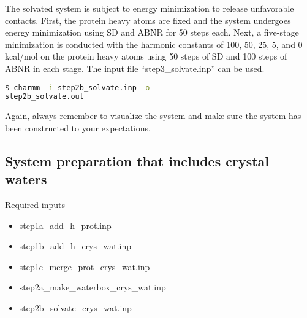 The solvated system is subject to energy minimization to release unfavorable contacts. 
First, the protein heavy atoms are fixed and the system undergoes energy minimization using SD and ABNR for 50 steps each. 
Next, a five-stage minimization is conducted with the harmonic constants
of 100, 50, 25, 5, and 0 kcal/mol on the protein heavy atoms using 50 steps of SD and 100 steps of ABNR in each stage. 
The input file
``step3\_solvate.inp'' 
can be used.
%
\begin{lstlisting}[language=bash]
$ charmm -i step2b_solvate.inp -o
step2b_solvate.out
\end{lstlisting}
%
Again, always remember to visualize the system and make sure the system has been constructed to your expectations. 

\subsection{System preparation that includes crystal waters}

\begin{checklist}{Required inputs}
\begin{itemize}
\item step1a\_add\_h\_prot.inp
\item step1b\_add\_h\_crys\_wat.inp
\item step1c\_merge\_prot\_crys\_wat.inp
\item step2a\_make\_waterbox\_crys\_wat.inp
\item step2b\_solvate\_crys\_wat.inp 
\end{itemize}
\end{checklist}

